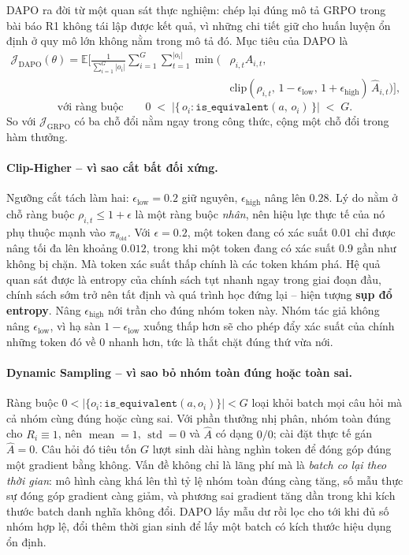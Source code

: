 DAPO \cite{yu2025dapo} ra đời từ một quan sát thực nghiệm: chép lại đúng mô tả GRPO trong bài báo R1 không tái lập được kết quả, vì những chi tiết giữ cho huấn luyện ổn định ở quy mô lớn không nằm trong mô tả đó. Mục tiêu của DAPO là
\[
\begin{aligned}
\mathcal{J}_{\mathrm{DAPO}}(\theta) = \mathbb{E}\Big[\frac{1}{\sum_{i=1}^{G}|o_i|}\sum_{i=1}^{G}\sum_{t=1}^{|o_i|}
\min\big(&\rho_{i,t}\hat{A}_{i,t},\\
&\mathrm{clip}(\rho_{i,t},\,1-\epsilon_{\mathrm{low}},\,1+\epsilon_{\mathrm{high}})\,\hat{A}_{i,t}\big)\Big],
\end{aligned}
\]
\[
\text{với ràng buộc}\qquad 0 \;<\; \big|\{\,o_i : \texttt{is\_equivalent}(a,\, o_i)\,\}\big| \;<\; G .
\]
So với $\mathcal{J}_{\mathrm{GRPO}}$ có ba chỗ đổi nằm ngay trong công thức, cộng một chỗ đổi trong hàm thưởng.

\paragraph{Clip-Higher -- vì sao cắt bất đối xứng.}
Ngưỡng cắt tách làm hai: $\epsilon_{\mathrm{low}} = 0.2$ giữ nguyên, $\epsilon_{\mathrm{high}}$ nâng lên $0.28$. Lý do nằm ở chỗ ràng buộc $\rho_{i,t} \le 1 + \epsilon$ là một ràng buộc \emph{nhân}, nên hiệu lực thực tế của nó phụ thuộc mạnh vào $\pi_{\theta_{\mathrm{old}}}$. Với $\epsilon = 0.2$, một token đang có xác suất $0.01$ chỉ được nâng tối đa lên khoảng $0.012$, trong khi một token đang có xác suất $0.9$ gần như không bị chặn. Mà token xác suất thấp chính là các token khám phá. Hệ quả quan sát được là entropy của chính sách tụt nhanh ngay trong giai đoạn đầu, chính sách sớm trở nên tất định và quá trình học đứng lại -- hiện tượng \textbf{sụp đổ entropy}. Nâng $\epsilon_{\mathrm{high}}$ nới trần cho đúng nhóm token này. Nhóm tác giả không nâng $\epsilon_{\mathrm{low}}$, vì hạ sàn $1-\epsilon_{\mathrm{low}}$ xuống thấp hơn sẽ cho phép đẩy xác suất của chính những token đó về 0 nhanh hơn, tức là thắt chặt đúng thứ vừa nới.

\paragraph{Dynamic Sampling -- vì sao bỏ nhóm toàn đúng hoặc toàn sai.}
Ràng buộc $0 < |\{o_i : \texttt{is\_equivalent}(a, o_i)\}| < G$ loại khỏi batch mọi câu hỏi mà cả nhóm cùng đúng hoặc cùng sai. Với phần thưởng nhị phân, nhóm toàn đúng cho $R_i \equiv 1$, nên $\operatorname{mean} = 1$, $\operatorname{std} = 0$ và $\hat{A}$ có dạng $0/0$; cài đặt thực tế gán $\hat{A} = 0$. Câu hỏi đó tiêu tốn $G$ lượt sinh dài hàng nghìn token để đóng góp đúng một gradient bằng không. Vấn đề không chỉ là lãng phí mà là \emph{batch co lại theo thời gian}: mô hình càng khá lên thì tỷ lệ nhóm toàn đúng càng tăng, số mẫu thực sự đóng góp gradient càng giảm, và phương sai gradient tăng dần trong khi kích thước batch danh nghĩa không đổi. DAPO lấy mẫu dư rồi lọc cho tới khi đủ số nhóm hợp lệ, đổi thêm thời gian sinh để lấy một batch có kích thước hiệu dụng ổn định.

